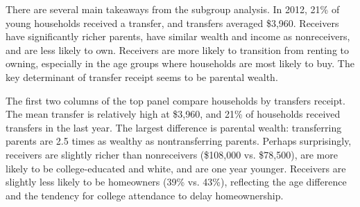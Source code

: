 \documentclass[12pt]{article}
\begin{document}
There are several main takeaways from the subgroup analysis. In 2012, 21\% of young households received a transfer, and transfers averaged \$3,960. Receivers have significantly richer parents, have similar wealth and income as nonreceivers, and are less likely to own. Receivers are more likely to transition from renting to owning, especially in the age groups where households are most likely to buy. The key determinant of transfer receipt seems to be parental wealth.

The first two columns of the top panel compare households by transfers receipt. The mean transfer is relatively high at \$3,960, and 21\% of households received transfers in the last year. The largest difference is parental wealth: transferring parents are 2.5 times as wealthy as nontransferring parents. Perhaps surprisingly, receivers are slightly richer than nonreceivers (\$108,000 vs. \$78,500), are more likely to be college-educated and white, and are one year younger. Receivers are slightly less likely to be homeowners (39\% vs. 43\%), reflecting the age difference and the tendency for college attendance to delay homeownership.
\end{document}
